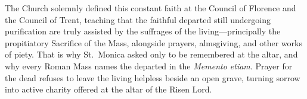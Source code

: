 The Church solemnly defined this constant faith at the Council of Florence and the Council of Trent, teaching that the faithful departed still undergoing purification are truly assisted by the suffrages of the living---principally the propitiatory Sacrifice of the Mass, alongside prayers, almsgiving, and other works of piety. That is why St.\ Monica asked only to be remembered at the altar, and why every Roman Mass names the departed in the \emph{Memento etiam}. Prayer for the dead refuses to leave the living helpless beside an open grave, turning sorrow into active charity offered at the altar of the Risen Lord.
